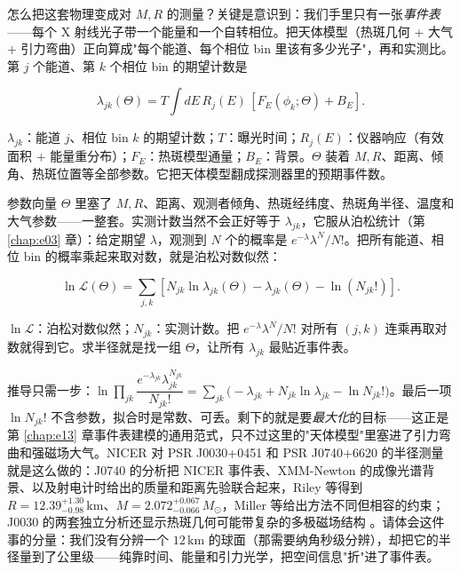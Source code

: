 怎么把这套物理变成对 \(M,R\) 的测量？关键是意识到：我们手里只有一张\emph{事件表}——每个 X 射线光子带一个能量和一个自转相位。把天体模型（热斑几何 + 大气 + 引力弯曲）正向算成"每个能道、每个相位 bin 里该有多少光子"，再和实测比。第 \(j\) 个能道、第 \(k\) 个相位 bin 的期望计数是

\begin{equation}
  \lambda_{jk}(\Theta)=
  T\int dE\,R_j(E)\,
  \left[F_E(\phi_k;\Theta)+B_E\right].
  \label{eq:e18-lambda}
\end{equation}
\begin{formulaexplain}
\(\lambda_{jk}\)：能道 \(j\)、相位 bin \(k\) 的期望计数；\(T\)：曝光时间；\(R_j(E)\)：仪器响应（有效面积 + 能量重分布）；\(F_E\)：热斑模型通量；\(B_E\)：背景。\(\Theta\) 装着 \(M,R\)、距离、倾角、热斑位置等全部参数。它把天体模型翻成探测器里的预期事件数。
\end{formulaexplain}

参数向量 \(\Theta\) 里塞了 \(M,R\)、距离、观测者倾角、热斑经纬度、热斑角半径、温度和大气参数——一整套。实测计数当然不会正好等于 \(\lambda_{jk}\)，它服从泊松统计（第 \ref{chap:e03} 章）：给定期望 \(\lambda\)，观测到 \(N\) 个的概率是 \(e^{-\lambda}\lambda^N/N!\)。把所有能道、相位 bin 的概率乘起来取对数，就是泊松对数似然：

\begin{equation}
  \ln\mathcal{L}(\Theta)=
  \sum_{j,k}\left[
  N_{jk}\ln\lambda_{jk}(\Theta)-\lambda_{jk}(\Theta)-\ln(N_{jk}!)
  \right].
  \label{eq:e18-lnl}
\end{equation}
\begin{formulaexplain}
\(\ln\mathcal{L}\)：泊松对数似然；\(N_{jk}\)：实测计数。把 \(e^{-\lambda}\lambda^N/N!\) 对所有 \((j,k)\) 连乘再取对数就得到它。求半径就是找一组 \(\Theta\)，让所有 \(\lambda_{jk}\) 最贴近事件表。
\end{formulaexplain}

推导只需一步：\(\ln\prod_{jk}\dfrac{e^{-\lambda_{jk}}\lambda_{jk}^{N_{jk}}}{N_{jk}!}=\sum_{jk}\big(-\lambda_{jk}+N_{jk}\ln\lambda_{jk}-\ln N_{jk}!\big)\)。最后一项 \(\ln N_{jk}!\) 不含参数，拟合时是常数、可丢。剩下的就是要\emph{最大化}的目标——这正是第 \ref{chap:e13} 章事件表建模的通用范式，只不过这里的"天体模型"里塞进了引力弯曲和强磁场大气。NICER 对 PSR J0030+0451 和 PSR J0740+6620 的半径测量就是这么做的：J0740 的分析把 NICER 事件表、XMM-Newton 的成像光谱背景、以及射电计时给出的质量和距离先验联合起来，Riley 等得到 \(R=12.39^{+1.30}_{-0.98}\,\mathrm{km}\)、\(M=2.072^{+0.067}_{-0.066}\,M_\odot\)，Miller 等给出方法不同但相容的约束；J0030 的两套独立分析还显示热斑几何可能带复杂的多极磁场结构 \citep{2019ApJ...887L..21R,2019ApJ...887L..24M,2021ApJ...918L..27R,2021ApJ...918L..28M}。请体会这件事的分量：我们没有分辨一个 \(12\,\mathrm{km}\) 的球面（那需要纳角秒级分辨），却把它的半径量到了公里级——纯靠时间、能量和引力光学，把空间信息"折"进了事件表。


